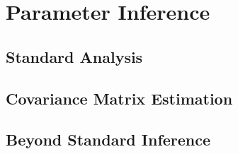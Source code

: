 \chapter{Parameter Inference }

\section{Standard Analysis}

\section{Covariance Matrix Estimation} %

\section{Beyond Standard Inference} %
